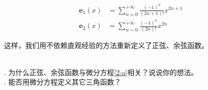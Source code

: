 \documentclass[12pt,UTF8,fontset=none]{ctexbook}
\begin{document}
\begin{appendix}
\begin{align*}
    \mathbf{e}_1(x) &= \sum_{n=0}^{+\infty} \frac{(-1)^n}{(2n+1)!} x^{2n+1} \\
    \mathbf{e}_2(x) &= \sum_{n=0}^{+\infty} \frac{(-1)^n}{(2n)!} x^{2n} 
\end{align*}

这样，我们用不依赖直观经验的方法重新定义了正弦、余弦函数。

\begin{sk}
    \mbox{} \\
    . 为什么正弦、余弦函数与微分方程\eqref{2-a}相关？说说你的想法。\\
    . 能否用微分方程定义其它三角函数？
\end{sk}

\end{appendix}
\end{document}
